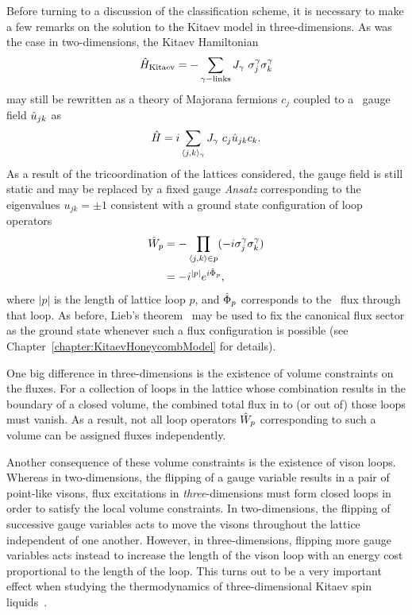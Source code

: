 Before turning to a discussion of the classification scheme, it is necessary to make a few remarks on the solution to the Kitaev model in three-dimensions.
As was the case in two-dimensions, the Kitaev Hamiltonian
%
\begin{equation}
	\hat{H}_{\rm Kitaev} = -\sum_{\gamma {\rm -links}} J_{\gamma}~\sigma^{\gamma}_j \sigma^{\gamma}_k
\end{equation}
%
may still be rewritten as a theory of Majorana fermions $c_j$ coupled to a \ZZ~gauge field $\hat{u}_{jk}$ as
%
\begin{equation}
	\hat{H} = i \sum_{\langle j,k \rangle_{\gamma}} J_{\gamma}~c_j \hat{u}_{jk} c_k.
\end{equation}
%
As a result of the tricoordination of the lattices considered, the gauge field is still static and may be replaced by a fixed gauge \textit{Ansatz} corresponding to the eigenvalues $u_{jk} = \pm 1$ consistent with a ground state configuration of loop operators
%
\begin{align}
	\hat{W}_p &= -\prod_{\langle j,k \rangle \in p} (-i \sigma^{\gamma}_j \sigma^{\gamma}_k) \nonumber\\
			 &= -i^{|p|} e^{i \hat{\Phi}_p},
\end{align}
%
where $|p|$ is the length of lattice loop $p$, and $\hat{\Phi}_p$ corresponds to the \ZZ~flux through that loop.
As before, Lieb's theorem~\cite{LiebHPA1992,LiebDMJ1993,LiebPRL1994} may be used to fix the canonical flux sector as the ground state whenever such a flux configuration is possible (see Chapter~\ref{chapter:KitaevHoneycombModel} for details).

One big difference in three-dimensions is the existence of volume constraints on the fluxes.
For a collection of loops in the lattice whose combination results in the boundary of a closed volume, the combined total flux in to (or out of) those loops must vanish.
As a result, not all loop operators $\hat{W}_p$ corresponding to such a volume can be assigned fluxes independently.

Another consequence of these volume constraints is the existence of vison loops.
Whereas in two-dimensions, the flipping of a gauge variable results in a pair of point-like visons, flux excitations in \textit{three}-dimensions must form closed loops in order to satisfy the local volume constraints.
In two-dimensions, the flipping of successive gauge variables acts to move the visons throughout the lattice independent of one another.
However, in three-dimensions, flipping more gauge variables acts instead to increase the length of the vison loop with an energy cost proportional to the length of the loop.
This turns out to be a very important effect when studying the thermodynamics of three-dimensional Kitaev spin liquids~\cite{NasuPRL2014}.

